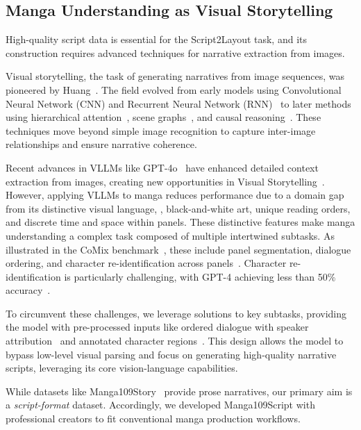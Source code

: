 \subsection{Manga Understanding as Visual Storytelling}
High-quality script data is essential for the Script2Layout task, and its construction requires advanced techniques for narrative extraction from images.

Visual storytelling, the task of generating narratives from image sequences, was pioneered by Huang~\cite{huang_visual_2016}. The field evolved from early models using Convolutional Neural Network (CNN) and Recurrent Neural Network (RNN)~\cite{yu2017hierarchicallyattentivernnalbumsummarization} to later methods using hierarchical attention~\cite{nahian_hierarchical_2019}, scene graphs~\cite{wang_storytelling_scenegraphs2020}, and causal reasoning~\cite{song2024causalstorylocalcausalattention}. These techniques move beyond simple image recognition to capture inter-image relationships and ensure narrative coherence.

Recent advances in VLLMs like GPT-4o~\cite{wu_gpt-4o_2024} have enhanced detailed context extraction from images, creating new opportunities in Visual Storytelling~\cite{yang_storyllava_2025}.
However, applying VLLMs to manga reduces performance due to a domain gap from its distinctive visual language, \eg, black-and-white art, unique reading orders, and discrete time and space within panels.
These distinctive features make manga understanding a complex task composed of multiple intertwined subtasks. As illustrated in the CoMix benchmark~\cite{vivoli_comicspap_2025}, these include panel segmentation, dialogue ordering, and character re-identification across panels~\cite{sachdeva_manga_2024}. Character re-identification is particularly challenging, with GPT-4 achieving less than 50\% accuracy~\cite{vivoli_comicspap_2025}.

To circumvent these challenges, we leverage solutions to key subtasks, providing the model with pre-processed inputs like ordered dialogue with speaker attribution~\cite{li_manga109dialog_2024} and annotated character regions~\cite{shtedritski_what_2023}. This design allows the model to bypass low-level visual parsing and focus on generating high-quality narrative scripts, leveraging its core vision-language capabilities.

While datasets like Manga109Story~\cite{chen_manga_2024} provide prose narratives, our primary aim is a {\it script-format} dataset. Accordingly, we developed Manga109Script with professional creators to fit conventional manga production workflows.